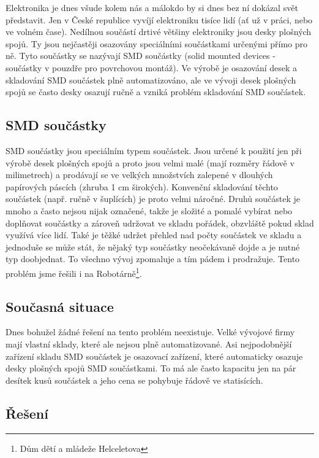 \documentclass[12pt, a4paper, oneside]{article}
\begin{document}
Elektronika je dnes všude kolem nás a málokdo by si dnes bez ní dokázal svět představit. Jen v České republice vyvíjí elektroniku tisíce lidí (ať už v práci, nebo ve volném čase). Nedílnou součástí drtivé většiny elektroniky jsou desky plošných spojů. Ty jsou nejčastěji osazovány speciálními součástkami určenými přímo pro ně. Tyto součástky se nazývají SMD součástky (solid mounted devices - součástky v pouzdře pro povrchovou montáž). Ve výrobě je osazování desek a skladování SMD součástek plně automatizováno, ale ve vývoji desek plošných spojů se často desky osazují ručně a vzniká problém skladování SMD součástek.

\subsection{SMD součástky}

SMD součástky jsou speciálním typem součástek. Jsou určené k použití jen při výrobě desek plošných spojů a proto jsou velmi malé (mají rozměry řádově v milimetrech) a prodávají se ve velkých množstvích zalepené v dlouhých papírových páscích (zhruba 1 cm širokých). Konvenční skladování těchto součástek (např. ručně v šuplících) je proto velmi náročné. Druhů součástek je mnoho a často nejsou nijak označené, takže je složité a pomalé vybírat nebo doplňovat součástky a zároveň udržovat ve skladu pořádek, obzvláště pokud sklad využívá více lidí. Také je těžké udržet přehled nad počty součástek ve skladu a jednoduše se může stát, že nějaký typ součástky neočekávaně dojde a je nutné typ doobjednat. To všechno vývoj zpomaluje a tím pádem i prodražuje. Tento problém jsme řešili i na Robotárně\footnote{Dům dětí a mládeže Helceletova}.

\subsection{Současná situace}

Dnes bohužel žádné řešení na tento problém neexistuje. Velké vývojové firmy mají vlastní sklady, které ale nejsou plně automatizované. Asi nejpodobnější zařízení skladu SMD součástek je osazovací zařízení, které automaticky osazuje desky plošných spojů SMD součástkami. To má ale často kapacitu jen na pár desítek kusů součástek a jeho cena se pohybuje řádově ve statisících.

\subsection{Řešení}
\end{document}
